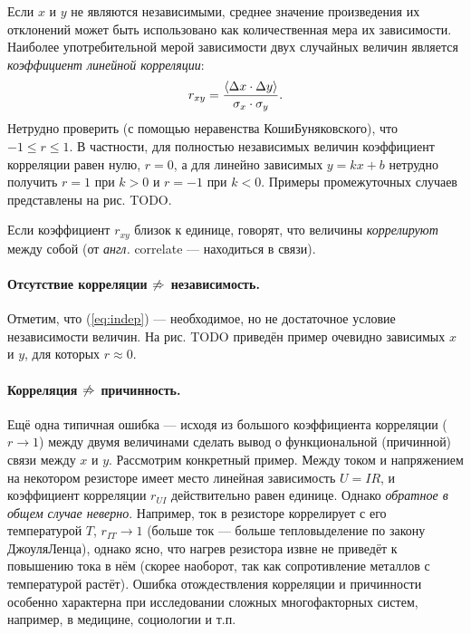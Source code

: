 Если $x$ и $y$ не являются независимыми, среднее значение произведения
их отклонений может быть использовано как количественная мера их зависимости.
Наиболее употребительной мерой зависимости двух случайных величин
является \emph{коэффициент линейной корреляции}:
\begin{equation}
r_{xy}=\frac{\left<\Delta x\cdot\Delta y\right>}{\sigma_{x}\cdot\sigma_{y}}.\label{eq:pearson}
\end{equation}
Нетрудно проверить (с помощью неравенства Коши\textendash Буняковского),
что $-1\le r\le1$. В частности, для полностью независимых величин
коэффициент корреляции равен нулю, $r=0$, а для линейно зависимых
$y=kx+b$ нетрудно получить $r=1$ при $k>0$ и $r=-1$ при $k<0$.
Примеры промежуточных случаев представлены на рис. TODO.

Если коэффициент $r_{xy}$ близок к единице, говорят, что величины
\emph{коррелируют} между собой (от \emph{англ.} correlate ---
находиться в связи).

\paragraph{Отсутствие корреляции $\protect\not\Rightarrow$ независимость.}

Отметим, что (\ref{eq:indep}) --- необходимое,
но не достаточное условие независимости величин. На рис. TODO приведён
пример очевидно зависимых $x$ и $y$, для которых $r\approx0$.

\paragraph{Корреляция $\protect\not\Rightarrow$ причинность.}

Ещё одна типичная ошибка --- исходя из большого
коэффициента корреляции ($r\to1$) между двумя величинами сделать
вывод о функциональной (причинной) связи между $x$ и $y$. Рассмотрим
конкретный пример. Между током и напряжением на некотором резисторе
имеет место линейная зависимость $U=IR$, и коэффициент корреляции
$r_{UI}$ действительно равен единице. Однако \emph{обратное
в общем случае неверно}. Например, ток в резисторе коррелирует
с его температурой $T$, $r_{IT}\to1$ (больше ток --- больше
тепловыделение по закону Джоуля\textendash Ленца), однако ясно, что
нагрев резистора извне не приведёт к повышению тока в нём (скорее
наоборот, так как сопротивление металлов с температурой растёт). Ошибка
отождествления корреляции и причинности особенно характерна при исследовании
сложных многофакторных систем, например, в медицине, социологии и
т.п.

